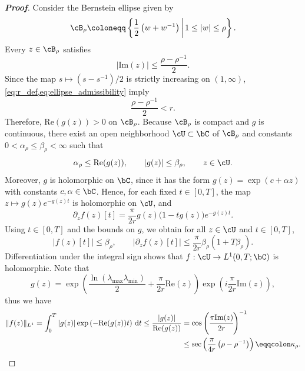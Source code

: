 \begin{proof}[\bf Proof]
Consider the Bernstein ellipse given by
\begin{equation*}
\cB_{\rho}
\coloneqq
\left\{\frac{1}{2}\left(w+w^{-1}\right)\,\middle |\, 1\le |w|\le \rho\right\}.
\end{equation*}
Every $z\in\cB_{\rho}$ satisfies
\begin{equation*}
|\mathrm{Im}(z)|\le \frac{\rho-\rho^{-1}}{2}.
\end{equation*}
Since the map $s\mapsto (s-s^{-1})/2$ is strictly increasing on $(1,\infty)$, \cref{eq:r_def,eq:ellipse_admissibility} imply
\begin{equation*}
\frac{\rho-\rho^{-1}}{2}<r.
\end{equation*}
Therefore, $\mathrm{Re}(g(z))>0$ on $\cB_\rho$. Because $\cB_\rho$ is compact and $g$ is continuous, there exist an open neighborhood $\cU\subset\bC$ of $\cB_\rho$ and constants $0<\alpha_\rho\leq \beta_\rho<\infty$ such that
\begin{equation*}
\alpha_\rho\leq \mathrm{Re}(g(z)),
\qquad
|g(z)|\le \beta_\rho,
\qquad z\in \cU.
\end{equation*}
Moreover, $g$ is holomorphic on $\bC$, since it has the form $g(z)=\exp(c+\alpha z)$ with constants $c,\alpha\in\bC$. Hence, for each fixed $t\in[0,T]$, the map $z\mapsto g(z)e^{-g(z)t}$ is holomorphic on $\cU$, and
\begin{equation*}
\partial_z f(z)[t]
=
\frac{\pi}{2r}g(z)\bigl(1-tg(z)\bigr)e^{-g(z)t}.
\end{equation*}
Using $t\in[0,T]$ and the bounds on $g$, we obtain for all $z\in \cU$ and $t\in[0,T]$,
\begin{equation*}
|f(z)[t]|\le \beta_\rho,
\qquad
|\partial_z f(z)[t]|
\le
\frac{\pi}{2r}\beta_\rho(1+T\beta_\rho).
\end{equation*}
Differentiation under the integral sign shows that $f:\cU\to L^1(0,T;\bC)$ is holomorphic. Note that
\begin{equation*}
g(z)
=
\exp\left(
\frac{\ln(\lambda_{\max}\lambda_{\min})}{2}
+\frac{\pi}{2r}\mathrm{Re}(z)
\right)
\exp\left(i\frac{\pi}{2r}\mathrm{Im}(z)\right),
\end{equation*}
thus we have
\begin{align}\label{eq:def_kappa_varrho}
\|f(z)\|_{L^1}
=\int_0^T |g(z)|\exp\left(-\mathrm{Re}(g(z))t\right)\,\mathrm dt \leq \frac{|g(z)|}{\mathrm{Re}(g(z))} &= \cos\left(\cfrac{\pi\mathrm{Im}(z)}{2r}\right)^{-1}\nonumber\\
&\leq\sec\left(
\frac{\pi}{4r}\left(\rho-\rho^{-1}\right)
\right)
\eqqcolon \kappa_{\rho}.
\end{align}


\end{proof}
